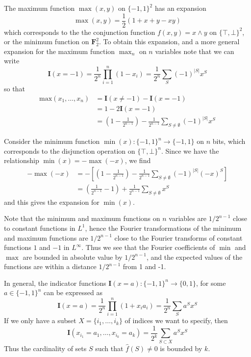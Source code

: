 \begin{example}
    The maximum function $\max(x,y)$ on $\{ -1, 1 \}^2$ has an expansion
    \[ \max(x,y) = \frac{1}{2} \left( 1 + x + y - xy \right) \]
    which corresponds to the the conjunction function $f(x,y) = x \wedge y$ on $\{ \top, \bot \}^2$, or the minimum function on $\mathbf{F}_2^2$. To obtain this expansion, and a more general expansion for the maximum function $\max_n$ on $n$ variables note that we can write
    \[ \mathbf{I}(x = -1) = \frac{1}{2^n} \prod_{i = 1}^n (1 - x_i) = \frac{1}{2^n} \sum_S (-1)^{|S|} x^S \]
    so that
    \begin{align*}
        \text{max}(x_1, \dots, x_n) &= \mathbf{I}(x \neq -1) - \mathbf{I}(x = -1)\\
        &= 1 - 2 \mathbf{I}(x = -1)\\
        &= \left(1 - \frac{1}{2^{n-1}} \right) - \frac{1}{2^{n-1}} \sum_{S \neq \emptyset} (-1)^{|S|} x^S
    \end{align*}
\end{example}

\begin{example}
    Consider the minimum function $\min(x): \{ -1, 1 \}^n \to \{ -1, 1 \}$ on $n$ bits, which corresponds to the disjunction operation on $\{ \top, \bot \}^n$. Since we have the relationship $\min(x) = - \max(-x)$, we find
    \begin{align*}
        -\max(-x) &= - \left[ \left(1 - \frac{1}{2^{n-1}} \right) - \frac{1}{2^{n-1}} \sum_{S \neq \emptyset} (-1)^{|S|} (-x)^S \right]\\
        &= \left( \frac{1}{2^{n-1}} - 1 \right) + \frac{1}{2^{n-1}} \sum_{S \neq \emptyset} x^S
    \end{align*}
    and this gives the expansion for $\min(x)$.
\end{example}

Note that the minimum and maximum functions on $n$ variables are $1/2^{n-1}$ close to constant functions in $L^1$, hence the Fourier transformations of the minimum and maximum functions are $1/2^{n-1}$ close to the Fourier transforms of constant functions $1$ and $-1$ in $L^\infty$. Thus we see that the Fourier coefficients of $\min$ and $\max$ are bounded in absolute value by $1/2^{n-1}$, and the expected values of the functions are within a distance $1/2^{n-1}$ from 1 and -1.

\begin{example}
    In general, the indicator functions $\mathbf{I}(x = a): \{ -1, 1 \}^n \to \{ 0, 1 \}$, for some $a \in \{ -1, 1 \}^n$ can be expressed as
    \[ \mathbf{I}(x = a) = \frac{1}{2^n} \prod_{i = 1}^n \left( 1 + x_i a_i \right) = \frac{1}{2^n} \sum_S a^S x^S \]
    If we only have a subset $X = \{ i_1, \dots, i_k \}$ of indices we want to specify, then
    \[ \mathbf{I}(x_{i_1} = a_1, \dots, x_{i_k} = a_k) = \frac{1}{2^k} \sum_{S \subset X} a^S x^S \]
    Thus the cardinality of sets $S$ such that $\widehat{f}(S) \neq 0$ is bounded by $k$.
\end{example}

